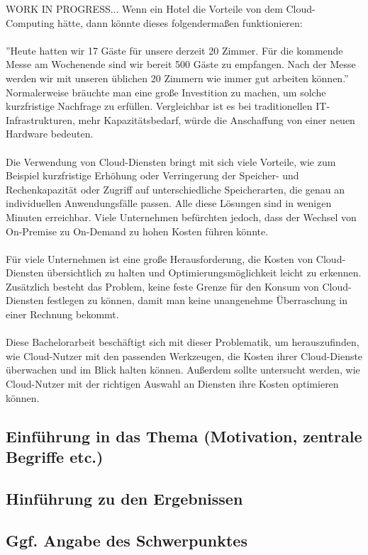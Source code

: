WORK IN PROGRESS...
Wenn ein Hotel die Vorteile von dem Cloud-Computing hätte, dann könnte dieses folgendermaßen funktionieren:
\\\\
”Heute hatten wir 17 Gäste für unsere derzeit 20 Zimmer. Für die kommende Messe am Wochenende sind wir bereit 500 Gäste zu empfangen. Nach der Messe werden wir mit unseren üblichen 20 Zimmern wie immer gut arbeiten können.”
Normalerweise bräuchte man eine große Investition zu machen, um solche kurzfristige Nachfrage zu erfüllen. Vergleichbar ist es bei traditionellen IT-Infrastrukturen, mehr Kapazitätsbedarf, würde die Anschaffung von einer neuen Hardware bedeuten.
\\\\
Die Verwendung von Cloud-Diensten bringt mit sich viele Vorteile, wie zum Beispiel kurzfristige Erhöhung oder Verringerung der Speicher- und Rechenkapazität oder Zugriff auf unterschiedliche Speicherarten, die genau an individuellen Anwendungsfälle passen. Alle diese Lösungen sind in wenigen Minuten erreichbar. Viele Unternehmen befürchten jedoch, dass der Wechsel von On-Premise zu On-Demand zu hohen Kosten führen könnte.
\\\\
Für viele Unternehmen ist eine große Herausforderung, die Kosten von Cloud-Diensten übersichtlich zu halten und Optimierungsmöglichkeit leicht zu erkennen. Zusätzlich besteht das Problem, keine feste Grenze für den Konsum von Cloud-Diensten festlegen zu können, damit man keine unangenehme Überraschung in einer Rechnung bekommt. 
\\\\
Diese Bachelorarbeit beschäftigt sich mit dieser Problematik, um herauszufinden, wie Cloud-Nutzer mit den passenden Werkzeugen, die Kosten ihrer Cloud-Dienste überwachen und im Blick halten können. Außerdem sollte untersucht werden, wie Cloud-Nutzer mit der richtigen Auswahl an Diensten ihre Kosten optimieren können.
\subsection{Einführung in das Thema (Motivation, zentrale Begriffe etc.)}
\subsection{Hinführung zu den Ergebnissen}
\subsection{Ggf. Angabe des Schwerpunktes}
